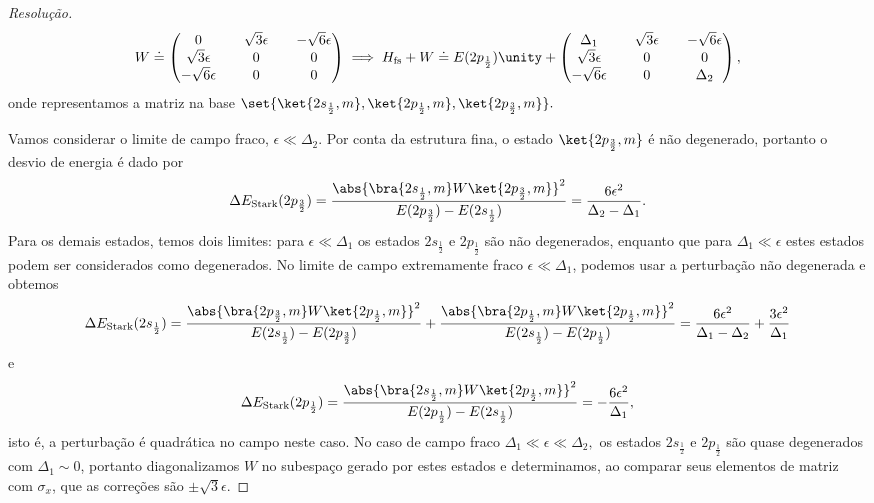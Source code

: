 \begin{proof}[Resolução]
   \begin{equation*}
      W \doteq \begin{pmatrix}
      0 && \sqrt{3} \epsilon && -\sqrt{6} \epsilon\\
      \sqrt{3} \epsilon && 0 && 0\\
      -\sqrt{6} \epsilon && 0 && 0\\
      \end{pmatrix} \implies
      H_\mathrm{fs} + W \doteq E(2p_{\frac12})\unity + \begin{pmatrix}
      \Delta_1 && \sqrt{3} \epsilon && -\sqrt{6} \epsilon\\
      \sqrt{3} \epsilon && 0 && 0\\
      -\sqrt{6} \epsilon && 0 && \Delta_2\\
      \end{pmatrix},
   \end{equation*}
   onde representamos a matriz na base \(\set{\ket{2s_\frac12,m}, \ket{2p_{\frac12}, m}, \ket{2p_{\frac32},m}}.\) 

   Vamos considerar o limite de campo fraco, \(\epsilon \ll \Delta_2\). Por conta da estrutura fina, o estado \(\ket{2p_{\frac32},m}\) é não degenerado, portanto o desvio de energia é dado por
   \begin{equation*}
      \Delta E_\mathrm{Stark}(2p_{\frac32}) = \frac{\abs{\bra{2s_{\frac12},m}W\ket{2p_{\frac32},m}}^2}{E(2p_{\frac32}) - E(2s_{\frac12})} = \frac{6 \epsilon^2}{\Delta_2 - \Delta_1}.
   \end{equation*}
   Para os demais estados, temos dois limites: para \(\epsilon \ll \Delta_1\) os estados \(2s_{\frac12}\) e \(2p_{\frac12}\) são não degenerados, enquanto que para \(\Delta_1 \ll \epsilon\) estes estados podem ser considerados como degenerados. No limite de campo extremamente fraco \(\epsilon \ll \Delta_1\), podemos usar a perturbação não degenerada e obtemos
   \begin{equation*}
      \Delta E_\mathrm{Stark}(2s_{\frac12}) = \frac{\abs{\bra{2p_{\frac32},m}W\ket{2p_{\frac12},m}}^2}{E(2s_{\frac12}) - E(2p_{\frac32})} + \frac{\abs{\bra{2p_{\frac12},m}W\ket{2p_{\frac12},m}}^2}{E(2s_{\frac12}) - E(2p_{\frac12})}= \frac{6 \epsilon^2}{\Delta_1 - \Delta_2} + \frac{3 \epsilon^2}{\Delta_1}
   \end{equation*}
   e
   \begin{equation*}
      \Delta E_\mathrm{Stark}(2p_{\frac12}) = \frac{\abs{\bra{2s_{\frac12},m}W\ket{2p_{\frac12},m}}^2}{E(2p_{\frac12}) - E(2s_{\frac12})} = -\frac{6 \epsilon^2}{\Delta_1},
   \end{equation*}
   isto é, a perturbação é quadrática no campo neste caso. No caso de campo fraco \(\Delta_1 \ll \epsilon \ll \Delta_2,\) os estados \(2s_{\frac12}\) e \(2p_{\frac12}\) são quase degenerados com \(\Delta_1 \sim 0\), portanto diagonalizamos \(W\) no subespaço gerado por estes estados e determinamos, ao comparar seus elementos de matriz com \(\sigma_x\), que as correções são \(\pm \sqrt{3} \epsilon\).


\end{proof}
